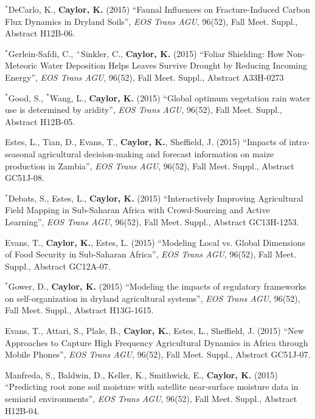 \documentclass[10pt]{report}
\begin{document}
\begin{etaremune}
\item $^{*}$DeCarlo, K., \textbf{Caylor, K.} (2015) ``Faunal Influences on Fracture-Induced Carbon Flux Dynamics in Dryland Soils'', \emph{EOS Trans AGU}, 96(52), Fall Meet. Suppl., Abstract H12B-06.

\item $^{*}$Gerlein-Safdi, C., $^{+}$Sinkler, C., \textbf{Caylor, K.} (2015) ``Foliar Shielding: How Non-Meteoric Water Deposition Helps Leaves Survive Drought by Reducing Incoming Energy'', \emph{EOS Trans AGU}, 96(52), Fall Meet. Suppl., Abstract A33H-0273

\item $^{*}$Good, S., $^{*}$Wang, L., \textbf{Caylor, K.} (2015) ``Global optimum vegetation rain water use is determined by aridity'', \emph{EOS Trans AGU}, 96(52), Fall Meet. Suppl., Abstract H12B-05.

\item Estes, L., Tian, D., Evans, T.,  \textbf{Caylor, K.}, Sheffield, J. (2015) ``Impacts of intra-seasonal agricultural decision-making and forecast information on maize production in Zambia'',  \emph{EOS Trans AGU}, 96(52), Fall Meet. Suppl., Abstract GC51J-08.

\item $^{*}$Debats, S., Estes, L., \textbf{Caylor, K.} (2015) ``Interactively Improving Agricultural Field Mapping in Sub-Saharan Africa with Crowd-Sourcing and Active Learning'',  \emph{EOS Trans AGU}, 96(52), Fall Meet. Suppl., Abstract GC13H-1253.

\item Evans, T., \textbf{Caylor, K.}, Estes, L. (2015) ``Modeling Local vs. Global Dimensions of Food Security in Sub-Saharan Africa'', \emph{EOS Trans AGU}, 96(52), Fall Meet. Suppl., Abstract GC12A-07.

\item $^{*}$Gower, D., \textbf{Caylor, K.} (2015) ``Modeling the impacts of regulatory frameworks on self-organization in dryland agricultural systems'', \emph{EOS Trans AGU}, 96(52), Fall Meet. Suppl., Abstract H13G-1615.

\item Evans, T., Attari, S., Plale, B., \textbf{Caylor, K.}, Estes, L., Sheffield, J. (2015) ``New Approaches to Capture High Frequency Agricultural Dynamics in Africa through Mobile Phones'', \emph{EOS Trans AGU}, 96(52), Fall Meet. Suppl., Abstract GC51J-07.

\item Manfreda, S., Baldwin, D., Keller, K., Smithwick, E., \textbf{Caylor, K.} (2015) ``Predicting root zone soil moisture with satellite near-surface moisture data in semiarid environments'',  \emph{EOS Trans AGU}, 96(52), Fall Meet. Suppl., Abstract H12B-04.


\end{etaremune}
\end{document}
